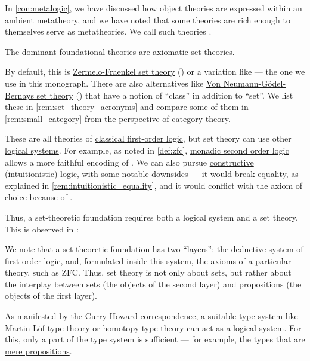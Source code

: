 \begin{concept}\label{con:foundational_theory}
  In \cref{con:metalogic}, we have discussed how object theories are expressed within an ambient metatheory, and we have noted that some theories are rich enough to themselves serve as metatheories. We call such theories .

  \begin{thmenum}
     The dominant foundational theories are \hyperref[def:axiomatic_set_theory]{axiomatic set theories}.

    By default, this is \hyperref[def:zfc]{Zermelo-Fraenkel set theory} () or a variation like \hyperref[def:axiom_of_universes]{} --- the one we use in this monograph. There are also alternatives like \hyperref[rem:set_theory_acronyms/nbg]{Von Neumann-G\"odel-Bernays set theory} () that have a notion of \enquote{class} in addition to \enquote{set}. We list these in \cref{rem:set_theory_acronyms} and compare some of them in \cref{rem:small_category} from the perspective of \hyperref[ch:category_theory]{category theory}.

    These are all theories of \hyperref[def:first_order_logic]{classical first-order logic}, but set theory can use other \hyperref[con:logical_system]{logical systems}. For example, as noted in \cref{def:zfc}, \hyperref[def:second_order_logic]{monadic second order logic} allows a more faithful encoding of . We can also pursue \hyperref[con:intuitionistic_logic]{constructive (intuitionistic) logic}, with some notable downsides --- it would break equality, as explained in \cref{rem:intuitionistic_equality}, and it would conflict with the axiom of choice because of .

    Thus, a set-theoretic foundation requires both a logical system and a set theory. This is observed in \cite[17]{UnivalentFoundationsProgram2013HoTT}:
    \begin{displayquote}
      We note that a set-theoretic foundation has two \enquote{layers}: the deductive system of first-order logic, and, formulated inside this system, the axioms of a particular theory, such as ZFC. Thus, set theory is not only about sets, but rather about the interplay between sets (the objects of the second layer) and propositions (the objects of the first layer).
    \end{displayquote}

     As manifested by the \hyperref[con:curry_howard_correspondence]{Curry-Howard correspondence}, a suitable \hyperref[def:abstract_type_system]{type system} like \hyperref[def:martin_lof_type_theory]{Martin-L\"of type theory} or \hyperref[def:homotopy_type_theory]{homotopy type theory} can act as a logical system. For this, only a part of the type system is sufficient --- for example, the types that are \hyperref[def:mere_proposition]{mere propositions}.


\end{thmenum}
\end{concept}
